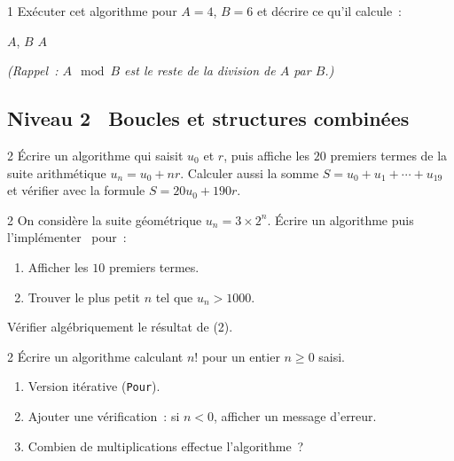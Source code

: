 \begin{exo}{1}
Ex\'ecuter cet algorithme pour $A=4$, $B=6$ et d\'ecrire ce qu'il calcule~:

\begin{algorithm}[H]
\Lire $A$, $B$\;
\Afficher $A$\;
\end{algorithm}

\emph{(Rappel~: $A \mod B$ est le reste de la division de $A$ par $B$.)}
\end{exo}

\subsection*{\quad Niveau 2 \textemdash\ Boucles et structures combin\'ees}

\begin{exo}{2}
\'Ecrire un algorithme qui saisit $u_0$ et $r$, puis affiche les $20$
premiers termes de la suite arithm\'etique $u_n = u_0 + nr$.
Calculer aussi la somme $S = u_0 + u_1 + \cdots + u_{19}$ et v\'erifier
avec la formule $S = 20u_0 + 190r$.
\end{exo}

\begin{exo}{2}
On consid\`ere la suite g\'eom\'etrique $u_n = 3 \times 2^n$.
\'Ecrire un algorithme puis l'impl\'ementer \computer\ pour~:
\begin{enumerate}
  \item Afficher les $10$ premiers termes.
  \item Trouver le plus petit $n$ tel que $u_n > 1000$.
\end{enumerate}
V\'erifier alg\'ebriquement le r\'esultat de (2).
\end{exo}

\begin{exo}{2}
\'Ecrire un algorithme calculant $n!$ pour un entier $n \geq 0$ saisi.
\begin{enumerate}
  \item Version it\'erative (\texttt{Pour}).
  \item Ajouter une v\'erification~: si $n < 0$, afficher un message d'erreur.
  \item Combien de multiplications effectue l'algorithme~?
\end{enumerate}
\end{exo}

